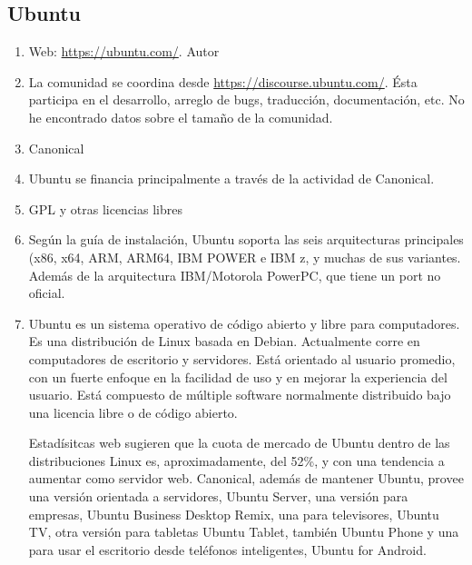 \subsection{Ubuntu}
\begin{enumerate}
    \item Web: \url{https://ubuntu.com/}. Autor
    \item La comunidad se coordina desde \url{https://discourse.ubuntu.com/}. Ésta participa en el desarrollo, arreglo de bugs, traducción, documentación, etc. No he encontrado datos sobre el tamaño de la comunidad.
    \item Canonical
    \item Ubuntu se financia principalmente a través de la actividad de Canonical.
    \item GPL y otras licencias libres
    \item Según la guía de instalación, Ubuntu soporta las seis arquitecturas principales (x86, x64, ARM, ARM64, IBM POWER e IBM z, y muchas de sus variantes.\\Además de la arquitectura IBM/Motorola PowerPC, que tiene un port no oficial.
    \item Ubuntu es un sistema operativo de código abierto y libre para computadores. Es una distribución de Linux basada en Debian. Actualmente corre en computadores de escritorio y servidores. Está orientado al usuario promedio, con un fuerte enfoque en la facilidad de uso y en mejorar la experiencia del usuario. Está compuesto de múltiple software normalmente distribuido bajo una licencia libre o de código abierto.
    
    Estadísitcas web sugieren que la cuota de mercado de Ubuntu dentro de las distribuciones Linux es, aproximadamente, del 52\%, y con una tendencia a aumentar como servidor web. Canonical, además de mantener Ubuntu, provee una versión orientada a servidores, Ubuntu Server, una versión para empresas, Ubuntu Business Desktop Remix, una para televisores, Ubuntu TV, otra versión para tabletas Ubuntu Tablet, también Ubuntu Phone y una para usar el escritorio desde teléfonos inteligentes, Ubuntu for Android.
\end{enumerate}



